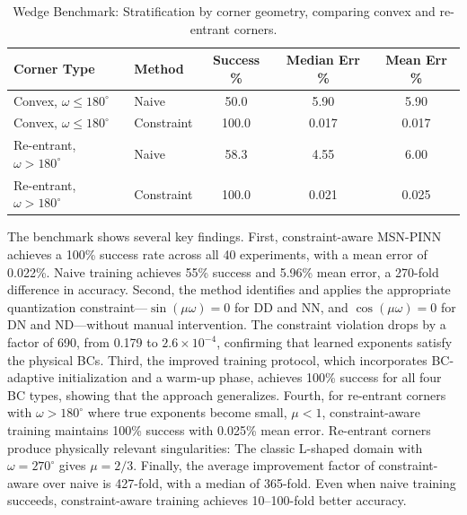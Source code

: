 \documentclass{article}
\theoremstyle{plain}
\theoremstyle{definition}
\theoremstyle{remark}
\begin{document}
\begin{table}[h!]
	\centering
	\caption{Wedge Benchmark: Stratification by corner geometry, comparing convex and re-entrant corners.}
	\label{tab:exp6_reentrant}
	\begin{tabular}{llccc}
		\arrayrulecolor{tablerule}\toprule
		\rowcolor{tableheader}
		Corner Type                      & Method     & Success \% & Median Err \% & Mean Err \% \\
		\midrule
		Convex, $\omega \leq 180^\circ$  & Naive      & 50.0       & 5.90          & 5.90        \\
		\rowcolor{tablerowalt}
		Convex, $\omega \leq 180^\circ$  & Constraint & 100.0      & 0.017         & 0.017       \\
		\midrule
		Re-entrant, $\omega > 180^\circ$ & Naive      & 58.3       & 4.55          & 6.00        \\
		\rowcolor{tablerowalt}
		Re-entrant, $\omega > 180^\circ$ & Constraint & 100.0      & 0.021         & 0.025       \\
		\bottomrule
	\end{tabular}
\end{table}

The benchmark shows several key findings. First, constraint-aware MSN-PINN achieves a 100\% success rate across all 40 experiments, with a mean error of 0.022\%. Naive training achieves 55\% success and 5.96\% mean error, a 270-fold difference in accuracy. Second, the method identifies and applies the appropriate quantization constraint---$\sin(\mu\omega)=0$ for DD and NN, and $\cos(\mu\omega)=0$ for DN and ND---without manual intervention. The constraint violation drops by a factor of 690, from 0.179 to $2.6 \times 10^{-4}$, confirming that learned exponents satisfy the physical BCs. Third, the improved training protocol, which incorporates BC-adaptive initialization and a warm-up phase, achieves 100\% success for all four BC types, showing that the approach generalizes. Fourth, for re-entrant corners with $\omega > 180^\circ$ where true exponents become small, $\mu < 1$, constraint-aware training maintains 100\% success with 0.025\% mean error. Re-entrant corners produce physically relevant singularities: The classic L-shaped domain with $\omega = 270^\circ$ gives $\mu = 2/3$. Finally, the average improvement factor of constraint-aware over naive is 427-fold, with a median of 365-fold. Even when naive training succeeds, constraint-aware training achieves 10--100-fold better accuracy.
\end{document}
